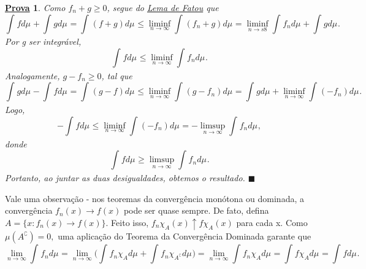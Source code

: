 \documentclass{article}
\newtheorem*{proof*}{\underline{Prova}}
\renewcommand\qedsymbol{$\blacksquare$}
\begin{document}
\begin{proof*}
  Como \(f_{n} +g \geq 0\), segue do \hyperlink{fatou}{Lema de Fatou} que 
    \[
      \int_{}f d\mu_{} + \int_{}g d\mu_{} = \int_{}(f+g) d\mu_{} \leq \liminf_{n\to \infty}\int_{}(f_{n}+g) d\mu_{} = \liminf_{n\to s8}\int_{}f_{n} d\mu_{} + \int_{}g d\mu_{}.
    \]
  Por g ser integrável, 
    \[
      \int_{}f d\mu_{} \leq \liminf_{n\to \infty}\int_{}f_{n} d\mu_{}.
    \]
  Analogamente, \(g-f_{n}\geq 0\), tal que 
    \[
      \int_{}g d\mu_{} - \int_{}f d\mu_{} = \int_{}(g-f) d\mu_{} \leq \liminf_{n\to \infty}\int_{}(g-f_{n}) d\mu_{} = \int_{}g d\mu_{} + \liminf_{n\to \infty}\int_{}(-f_{n}) d\mu_{}.
    \]
  Logo, 
    \[
      -\int_{}f d\mu_{} \leq \liminf_{n\to \infty}\int_{}(-f_{n}) d\mu_{} = - \limsup_{n\to \infty}\int_{}f_{n} d\mu_{},
    \]
  donde 
    \[
      \int_{}f d\mu_{} \geq \limsup_{n\to \infty}\int_{}f_{n} d\mu_{}.
    \]
  Portanto, ao juntar as duas desigualdades, obtemos o resultado. \qedsymbol
\end{proof*}
  Vale uma observação - nos teoremas da convergência monótona ou dominada, a convergência \(f_{n}(x)\to f(x)\) pode ser quase sempre. De fato, defina \(A = \{x:f_{n}(x)\to f(x)\}.\) Feito isso, 
  \(f_{n}\chi_{A}(x)\uparrow f \chi_{A}(x)\) para cada x. Como \(\mu (A ^{\complement}) = 0, \) uma aplicação do \hypertarget{dominated_convergence}{Teorema da Convergência Dominada} garante que 
    \[
      \lim_{n\to \infty}\int_{}f_{n} d\mu_{} = \lim_{n\to \infty}\biggl(\int_{}f_{n} \chi_{A} d\mu_{} + \int_{}f_{n}\chi_{A ^{\complement}} d\mu_{}\biggr) = \lim_{n\to \infty}\int_{}f_{n}\chi_{A} d\mu_{} = \int_{}f \chi_{A} d\mu_{} = \int_{}f d\mu_{}.
    \]
\end{document}
